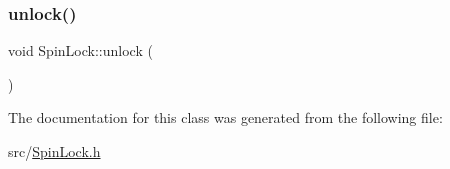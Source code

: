 \subsubsection{\texorpdfstring{unlock()}{unlock()}}
{\footnotesize\ttfamily void Spin\+Lock\+::unlock (\begin{DoxyParamCaption}{ }\end{DoxyParamCaption})\hspace{0.3cm}{\ttfamily [inline]}}



The documentation for this class was generated from the following file\+:\begin{DoxyCompactItemize}
\item 
src/\hyperlink{_spin_lock_8h}{Spin\+Lock.\+h}\end{DoxyCompactItemize}
